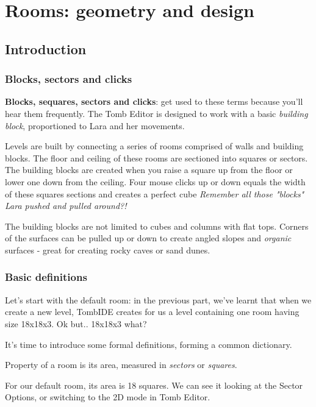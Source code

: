 \part{Rooms: geometry and design}

\chapter{Introduction}

\section{Blocks, sectors and clicks}

\textbf{Blocks, sequares, sectors and clicks}: get used to these terms because you'll hear them frequently. The Tomb Editor is designed to work with a basic \emph{building block}, proportioned to Lara and her movements.
\par Levels are built by connecting a series of rooms comprised of walls and building blocks. The floor and ceiling of these rooms are sectioned into squares or sectors. The building blocks are created when you raise a square up from the floor or lower one down from the ceiling. Four mouse clicks up or down equals the width of these squares sections and creates a perfect cube \emph{Remember all those "blocks" Lara pushed and pulled around?!}
\par The building blocks are not limited to cubes and columns with flat tops. Corners of the surfaces can be pulled up or down to create angled slopes and \emph{organic} surfaces - great for creating rocky caves or sand dunes. \cite{trle_manual}

\section{Basic definitions}

Let's start with the default room: in the previous part, we've learnt that when we create a new level, TombIDE creates for us a level containing one room having size 18x18x3. Ok but.. 18x18x3 what?

It's time to introduce some formal definitions, forming a common dictionary.

\begin{remark}
    Property of a room is its area, measured in \emph{sectors} or \emph{squares}.
\end{remark}

For our default room, its area is 18 squares. We can see it looking at the Sector Options, or switching to the 2D mode in Tomb Editor.

